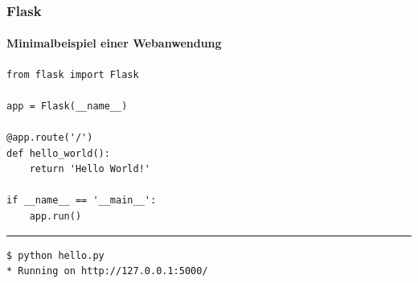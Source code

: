 \documentclass[
    t,
    smaller,
    compress,
    xcolor=svgnames,            %
    table,
]{beamer}
\begin{document}
\begin{frame}[fragile]
  \frametitle{Flask}
  \framesubtitle{Minimalbeispiel einer Webanwendung}

  \vspace{-12pt}
  \begin{lstlisting}[title=hello.py]
from flask import Flask

app = Flask(__name__)

@app.route('/')
def hello_world():
    return 'Hello World!'

if __name__ == '__main__':
    app.run()
  \end{lstlisting}
  \hrule
  \begin{lstlisting}
$ python hello.py
* Running on http://127.0.0.1:5000/
  \end{lstlisting}%
\end{frame}
\end{document}
